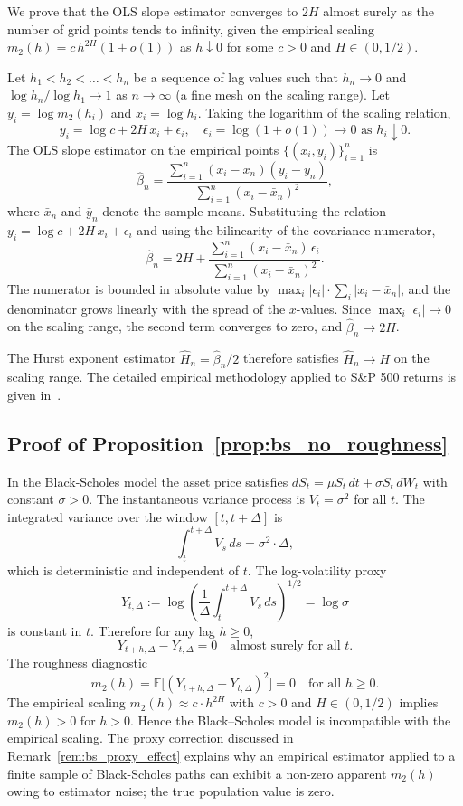 \documentclass[12pt,a4paper]{article}
\theoremstyle{definition}
\theoremstyle{plain}
\theoremstyle{remark}
\theoremstyle{plain}
\begin{document}
We prove that the OLS slope estimator converges to $2H$ almost surely
as the number of grid points tends to infinity, given the empirical
scaling $m_2(h) = c \, h^{2H} (1 + o(1))$ as $h \downarrow 0$ for some
$c > 0$ and $H \in (0, 1/2)$.

Let $h_1 < h_2 < \dots < h_n$ be a sequence of lag values such that
$h_n \to 0$ and $\log h_n / \log h_1 \to 1$ as $n \to \infty$ (a fine
mesh on the scaling range). Let $y_i = \log m_2(h_i)$ and $x_i = \log
h_i$. Taking the logarithm of the scaling relation,
\[
y_i = \log c + 2H \, x_i + \epsilon_i,
\quad \epsilon_i = \log(1 + o(1)) \to 0 \text{ as } h_i \downarrow 0.
\]
The OLS slope estimator on the empirical points
$\{(x_i, y_i)\}_{i=1}^n$ is
\[
\hat\beta_n = \frac{\sum_{i=1}^n (x_i - \bar x_n)(y_i - \bar y_n)}
{\sum_{i=1}^n (x_i - \bar x_n)^2},
\]
where $\bar x_n$ and $\bar y_n$ denote the sample means.
Substituting the relation $y_i = \log c + 2H \, x_i + \epsilon_i$ and
using the bilinearity of the covariance numerator,
\[
\hat\beta_n = 2H + \frac{\sum_{i=1}^n (x_i - \bar x_n) \, \epsilon_i}
{\sum_{i=1}^n (x_i - \bar x_n)^2}.
\]
The numerator is bounded in absolute value by
$\max_i |\epsilon_i| \cdot \sum_i |x_i - \bar x_n|$, and the
denominator grows linearly with the spread of the $x$-values. Since
$\max_i |\epsilon_i| \to 0$ on the scaling range, the second term
converges to zero, and $\hat\beta_n \to 2H$.

The Hurst exponent estimator $\hat H_n = \hat\beta_n / 2$ therefore
satisfies $\hat H_n \to H$ on the scaling range. The detailed
empirical methodology applied to S\&P 500 returns is given
in~\cite{GatheralRough}.

\subsection{Proof of Proposition~\ref{prop:bs_no_roughness}}
\label{proof:bs_no_roughness}

In the Black-Scholes model the asset price satisfies
$dS_t = \mu S_t \, dt + \sigma S_t \, dW_t$ with constant $\sigma > 0$.
The instantaneous variance process is $V_t = \sigma^2$ for all $t$.
The integrated variance over the window $[t, t + \Delta]$ is
\[
\int_t^{t + \Delta} V_s \, ds = \sigma^2 \cdot \Delta,
\]
which is deterministic and independent of $t$. The log-volatility
proxy
\[
Y_{t,\Delta} := \log\left(\frac{1}{\Delta} \int_t^{t+\Delta} V_s \, ds
\right)^{1/2} = \log \sigma
\]
is constant in $t$. Therefore for any lag $h \geq 0$,
\[
Y_{t+h,\Delta} - Y_{t,\Delta} = 0
\quad \text{almost surely for all } t.
\]
The roughness diagnostic
\[
m_2(h) = \mathbb{E}\bigl[(Y_{t+h,\Delta} - Y_{t,\Delta})^2\bigr] = 0
\quad \text{for all } h \geq 0.
\]
The empirical scaling
$m_2(h) \approx c \cdot h^{2H}$ with $c > 0$ and $H \in (0, 1/2)$
implies $m_2(h) > 0$ for $h > 0$. Hence the Black--Scholes model is
incompatible with the empirical scaling. The proxy correction
discussed in Remark~\ref{rem:bs_proxy_effect} explains why an
empirical estimator applied to a finite sample of Black-Scholes paths
can exhibit a non-zero apparent $m_2(h)$ owing to estimator noise; the
true population value is zero.
\end{document}
